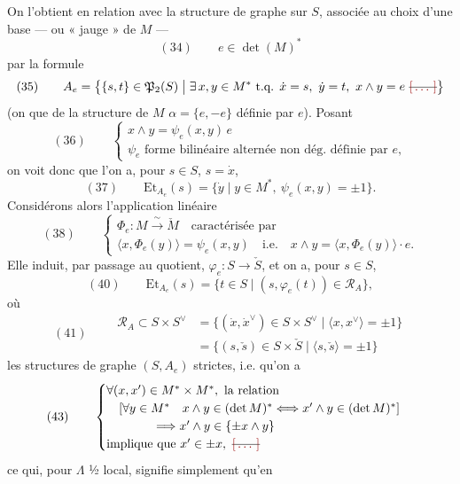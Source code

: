 \documentclass[11pt,a4paper]{article}
\begin{document}
On l'obtient en relation avec la structure de graphe sur
$S$, associée au choix d'une base — ou
« jauge » de $M$ —
\[
(34)\qquad e \in \det(M)^{*}
\]
par la  formule
\[
(35)\qquad A_e = \bigl\{\{s,t\} \in \mathfrak{P}_2(S) \bigm| \exists\, x, y \in M^{*} \text{ t.q. } \dot{x} = s,\ \dot{y} = t,\ x \wedge y = e\ \text{\struck{\ill{}}}\bigr\}
\]
(on  que de la structure  de $M$
$\alpha = \{e, -e\}$ définie par $e$). Posant
\[
(36)\qquad
\begin{cases}
x \wedge y = \psi_e(x,y)\, e \\
\psi_e \text{ forme bilinéaire alternée non dég. définie par } e ,
\end{cases}
\]
on voit donc que l'on a, pour $s \in S$, $s = \dot{x}$,
\[
(37)\qquad \mathrm{Et}_{A_e}(s) = \{\dot{y} \mid y \in M^{*},\ \psi_e(x,y) = \pm 1\} .
\]
Considérons alors l'application linéaire
\[
(38)\qquad
\begin{cases}
\Phi_e : M \xrightarrow{\ \sim\ } \check{M} \quad \text{caractérisée par} \\
\langle x, \Phi_e(y) \rangle = \psi_e(x,y) \quad \text{i.e.} \quad x \wedge y = \langle x, \Phi_e(y) \rangle \cdot e .
\end{cases}
\]
Elle induit, par passage au quotient,
$\varphi_e : S \to \check{S}$, et on a, pour $s \in S$,
\[
(40)\qquad \mathrm{Et}_{A_e}(s) = \{t \in S \mid (s, \varphi_e(t)) \in \mathcal{R}_A\} ,
\]
où
\[
(41)\qquad
\begin{aligned}
\mathcal{R}_A \subset S \times S^{\vee}
&= \{(\dot{x}, \dot{x}^{\vee}) \in S \times S^{\vee} \mid \langle x, x^{\vee} \rangle = \pm 1\} \\
&= \{(s, \check{s}) \in S \times \check{S} \mid \langle s, \check{s} \rangle = \pm 1\}
\end{aligned}
\]
 les structures de graphe $(S, A_e)$
strictes, i.e. qu'on a
\[
(43)\qquad
\begin{cases}
\forall (x, x') \in M^{*} \times M^{*}, \text{ la relation} \\
\quad [\forall y \in M^{*}\quad x \wedge y \in (\det M)^{*} \Longleftrightarrow x' \wedge y \in (\det M)^{*}] \\
\qquad\qquad \Longrightarrow x' \wedge y \in \{\pm x \wedge y\} \\
\text{implique que } x' \in \pm x,\ \text{\struck{\ill{}}}
\end{cases}
\]
ce qui, pour $\Lambda$ ½ local, signifie simplement qu'en
\end{document}
